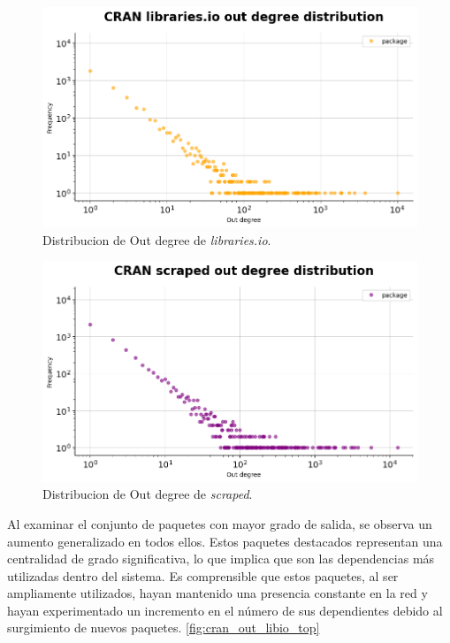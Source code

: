 \begin{figure}[ht!]
    \begin{center}
        \includegraphics[width=1\textwidth]{img/cran/out_deg.png}
        \caption{Distribucion de Out degree de \textit{libraries.io}.}
        \label{fig:cran_out_lib}
    \end{center}
\end{figure}

\begin{figure}[ht!]
    \begin{center}
        \includegraphics[width=1\textwidth]{img/cran/out_deg2.png}
        \caption{Distribucion de Out degree de \textit{scraped}.}
        \label{fig:cran_out_scraped}
    \end{center}
\end{figure}

Al examinar el conjunto de paquetes con mayor grado de salida, se observa un aumento generalizado
en todos ellos. Estos paquetes destacados representan una centralidad de grado significativa,
lo que implica que son las dependencias más utilizadas dentro del sistema. Es comprensible que
estos paquetes, al ser ampliamente utilizados, hayan mantenido una presencia constante en la
red y hayan experimentado un incremento en el número de sus dependientes debido al surgimiento
de nuevos paquetes. \ref{fig:cran_out_libio_top}

